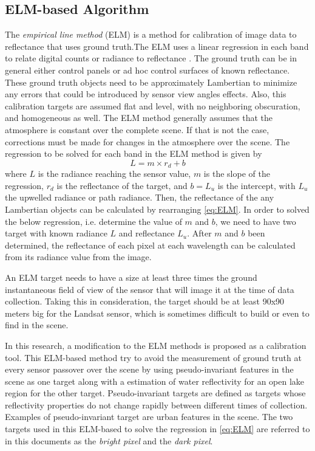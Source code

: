 \subsection{ ELM-based Algorithm}
The {\it empirical line method} (ELM) is a method for calibration of image data to reflectance that uses ground truth.The ELM uses a linear regression in each band to relate digital counts or radiance to reflectance \cite{Schott}. The ground truth can be in general  either control panels or ad hoc control surfaces of known reflectance. These ground truth objects need to be approximately Lambertian to minimize any errors that could be introduced by sensor view angles effects. Also, this calibration targets are assumed flat and level, with no neighboring obscuration, and homogeneous as well. The ELM method generally assumes that the atmosphere is constant over the complete scene. If that is not the case, corrections must be made for changes in the atmosphere over the scene. The regression to be solved for each band in the ELM method is given by
\begin{equation}
	\label{eq:ELM} 
	L = m\times r_d + b
\end{equation}
where $L$ is the radiance reaching the sensor value, $m$ is the slope of the regression, $r_d$ is the reflectance of the target, and $b=L_u$ is the intercept, with $L_u$ the upwelled radiance or path radiance. Then, the reflectance of the any Lambertian objects can be calculated by rearranging \autoref{eq:ELM}. In order to solved the below regression, i.e. determine the value of $m$ and $b$, we need to have two target with known radiance $L$ and reflectance $L_u$. After $m$ and $b$ been determined, the reflectance of each pixel at each wavelength can be calculated from its radiance value from the image.

An ELM target needs to have a size at least three times the ground instantaneous field of view of the sensor that will image it at the time of data collection. Taking this in consideration, the target should be at least 90x90 meters big for the Landsat sensor, which is sometimes difficult to build or even to find in the scene. 

In this research, a modification to the ELM methods is proposed as a calibration tool. This ELM-based method try to avoid the measurement of ground truth at every sensor passover over the scene by using pseudo-invariant features in the scene as one target along with a estimation of water reflectivity for an open lake region for the other target. Pseudo-invariant targets are defined as targets whose reflectivity properties do not change rapidly between different times of collection. Examples of pseudo-invariant target are urban features in the scene. The two targets used in this ELM-based to solve the regression in \autoref{eq:ELM} are referred to in this documents as the {\it bright pixel} and the {\it dark pixel}.

